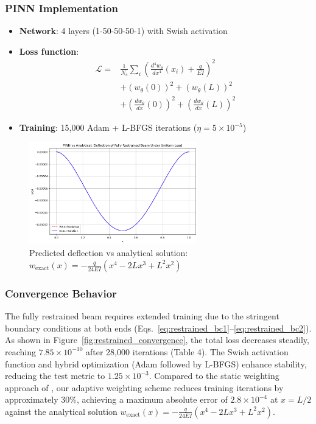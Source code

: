 \documentclass[12pt]{article}
\begin{document}
\subsubsection{PINN Implementation}
\begin{itemize}
	\item \textbf{Network}: 4 layers (1-50-50-50-1) with Swish activation
	\item \textbf{Loss function}:
	\begin{align*}
		\mathcal{L} = &\frac{1}{N_c}\sum_{i}\left(\frac{d^4w_{\theta}}{dx^4}(x_i) + \frac{q}{EI}\right)^2 \\
		&+ \left(w_{\theta}(0)\right)^2 + \left(w_{\theta}(L)\right)^2 \\
		&+ \left(\frac{dw_{\theta}}{dx}(0)\right)^2 + \left(\frac{dw_{\theta}}{dx}(L)\right)^2
	\end{align*}
	\item \textbf{Training}: 15,000 Adam + L-BFGS iterations ($\eta=5\times10^{-5}$)
\end{itemize}

\begin{figure}[htbp]
	\centering
	\includegraphics[width=0.65\textwidth]{restrained_results.png}
	\caption{Predicted deflection vs analytical solution: $w_{\text{exact}}(x) = -\frac{q}{24EI}(x^4 - 2Lx^3 + L^2x^2)$}
	\label{fig:restrained}
\end{figure}

\subsubsection{Convergence Behavior}
The fully restrained beam requires extended training due to the stringent boundary conditions at both ends (Eqs.~\ref{eq:restrained_bc1}--\ref{eq:restrained_bc2}). As shown in Figure~\ref{fig:restrained_convergence}, the total loss decreases steadily, reaching $7.85 \times 10^{-10}$ after 28,000 iterations (Table 4). The Swish activation function and hybrid optimization (Adam followed by L-BFGS) enhance stability, reducing the test metric to $1.25 \times 10^{-3}$. Compared to the static weighting approach of \citet{Zhang2020}, our adaptive weighting scheme reduces training iterations by approximately 30\%, achieving a maximum absolute error of $2.8 \times 10^{-4}$ at $x=L/2$ against the analytical solution $w_{\text{exact}}(x) = -\frac{q}{24EI}(x^4 - 2Lx^3 + L^2x^2)$.
\end{document}
